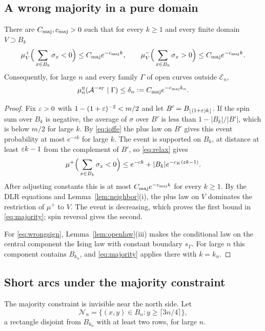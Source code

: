\subsection{A wrong majority in a pure domain}
\begin{lemma}\label{lem:majority}
There are $C_{\rm maj},c_{\rm maj}>0$ such that for every $k\ge1$ and every finite domain $V\supset B_k$
\begin{equation}\label{eq:majority}
 \mu_V^+\Big(\sum_{x\in B_k}\sigma_x<0\Big)\le C_{\rm maj}e^{-c_{\rm maj}k},\qquad
 \mu_V^-\Big(\sum_{x\in B_k}\sigma_x>0\Big)\le C_{\rm maj}e^{-c_{\rm maj}k}.
\end{equation}
Consequently, for large $n$ and every family $\Gamma$ of open curves outside $\mathcal E_n$,
\begin{equation}\label{eq:wrongsign}
 \mu_n^\eta(\mathcal A^{-s_\Gamma}\mid\Gamma)\le\delta_n:=C_{\rm maj}e^{-c_{\rm maj}k_n}.
\end{equation}
\end{lemma}
\begin{proof}
Fix $\varepsilon>0$ with $1-(1+\varepsilon)^{-2}<m/2$ and let $B'=B_{\lfloor(1+\varepsilon)k\rfloor}$. If the spin sum over $B_k$ is negative, the average of $\sigma$ over $B'$ is less than $1-|B_k|/|B'|$, which is below $m/2$ for large $k$. By \eqref{eq:ioffe} the plus law on $B'$ gives this event probability at most $e^{-ck}$ for large $k$. The event is supported on $B_k$, at distance at least $\varepsilon k-1$ from the complement of $B'$, so \eqref{eq:relax} gives
\[
 \mu^+\Big(\sum_{x\in B_k}\sigma_x<0\Big)\le e^{-ck}+|B_k|e^{-c_K(\varepsilon k-1)}.
\]
After adjusting constants this is at most $C_{\rm maj}e^{-c_{\rm maj}k}$ for every $k\ge1$. By the DLR equations and Lemma~\ref{lem:neighbor}(i), the plus law on $V$ dominates the restriction of $\mu^+$ to $V$. The event is decreasing, which proves the first bound in \eqref{eq:majority}; spin reversal gives the second.

For \eqref{eq:wrongsign}, Lemma~\ref{lem:openlaw}(iii) makes the conditional law on the central component the Ising law with constant boundary $s_\Gamma$. For large $n$ this component contains $B_{k_n}$, and \eqref{eq:majority} applies there with $k=k_n$.
\end{proof}

\subsection{Short arcs under the majority constraint}
The majority constraint is invisible near the north side. Let
\[
 \mathcal N_n=\{(x,y)\in B_n:y\ge\lceil3n/4\rceil\},
\]
a rectangle disjoint from $B_{k_n}$ with at least two rows, for large $n$.

